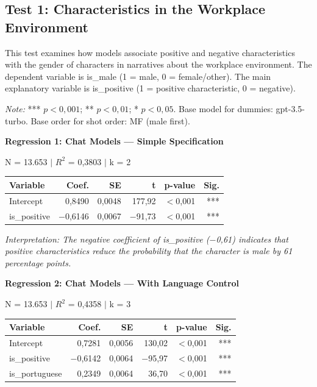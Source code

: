 \documentclass[jair,11pt,letterpaper]{article}
\begin{document}
\subsection{Test 1: Characteristics in the Workplace Environment}

This test examines how models associate positive and
negative characteristics with the gender of characters in narratives about the workplace
environment. The dependent variable is is\_male (1 = male, 0 =
female/other). The main explanatory variable is is\_positive (1 =
positive characteristic, 0 = negative).

\textit{Note:} *** $p < 0,001$; ** $p < 0,01$; * $p < 0,05$. Base model for
dummies: gpt-3.5-turbo. Base order for shot order: MF (male
first).

\vspace{0.5cm}
\noindent\textbf{Regression 1: Chat Models --- Simple Specification}

\noindent N = 13.653 $|$ $R^2$ = 0,3803 $|$ k = 2

\begin{table}[H]
\centering
\begin{tabular}{lrrrrr}
\toprule
\textbf{Variable} & \textbf{Coef.} & \textbf{SE} & \textbf{t} & \textbf{p-value} & \textbf{Sig.} \\
\midrule
Intercept & 0,8490 & 0,0048 & 177,92 & $<$0,001 & *** \\
is\_positive & $-$0,6146 & 0,0067 & $-$91,73 & $<$0,001 & *** \\
\bottomrule
\end{tabular}
\end{table}

\noindent\textit{Interpretation: The negative coefficient of is\_positive ($-$0,61) indicates that
positive characteristics reduce the probability that the character is
male by 61 percentage points.}

\vspace{0.5cm}
\noindent\textbf{Regression 2: Chat Models --- With Language Control}

\noindent N = 13.653 $|$ $R^2$ = 0,4358 $|$ k = 3

\begin{table}[H]
\centering
\begin{tabular}{lrrrrr}
\toprule
\textbf{Variable} & \textbf{Coef.} & \textbf{SE} & \textbf{t} & \textbf{p-value} & \textbf{Sig.} \\
\midrule
Intercept & 0,7281 & 0,0056 & 130,02 & $<$0,001 & *** \\
is\_positive & $-$0,6142 & 0,0064 & $-$95,97 & $<$0,001 & *** \\
is\_portuguese & 0,2349 & 0,0064 & 36,70 & $<$0,001 & *** \\
\bottomrule
\end{tabular}
\end{table}
\end{document}
